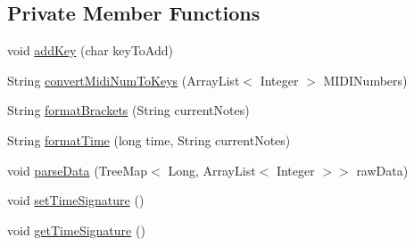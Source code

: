 \subsection*{Private Member Functions}
\begin{DoxyCompactItemize}
\item 
void \hyperlink{classcom_1_1lclion_1_1midiparser_1_1_m_i_d_i_parser_a95dc4fc863a442e4d13db55a30021dbc}{add\+Key} (char key\+To\+Add)
\item 
String \hyperlink{classcom_1_1lclion_1_1midiparser_1_1_m_i_d_i_parser_a0d273c8df789364bd05888eec0d887a1}{convert\+Midi\+Num\+To\+Keys} (Array\+List$<$ Integer $>$ M\+I\+D\+I\+Numbers)
\item 
String \hyperlink{classcom_1_1lclion_1_1midiparser_1_1_m_i_d_i_parser_a01a62f079f758bfd080cafec626e0bba}{format\+Brackets} (String current\+Notes)
\item 
String \hyperlink{classcom_1_1lclion_1_1midiparser_1_1_m_i_d_i_parser_aa721dfe0d567bb74d7d8b108cbd17989}{format\+Time} (long time, String current\+Notes)
\item 
void \hyperlink{classcom_1_1lclion_1_1midiparser_1_1_m_i_d_i_parser_a1a6947c3e60f6f74022834f05b71d8b3}{parse\+Data} (Tree\+Map$<$ Long, Array\+List$<$ Integer $>$$>$ raw\+Data)
\item 
void \hyperlink{classcom_1_1lclion_1_1midiparser_1_1_m_i_d_i_parser_a32e1f8f0f14a58552e8972fc6e02da30}{set\+Time\+Signature} ()
\item 
void \hyperlink{classcom_1_1lclion_1_1midiparser_1_1_m_i_d_i_parser_a0a6214124c40fd0db497cbdd73cf3a32}{get\+Time\+Signature} ()
\end{DoxyCompactItemize}
